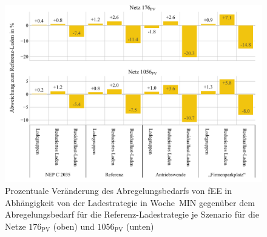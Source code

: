 \begin{figure}[H]
    \centering
    \includegraphics[width=\textwidth]{Bilder/176_1056_cur_fee_grid_week_A}
    \caption[Prozentuale Veränderung des Abregelungsbedarfs von fEE in Abhängigkeit von der Ladestrategie in Woche~MIN gegenüber dem Abregelungsbedarf für die Referenz-Ladestrategie je Szenario für die Netze \num{176} und \num{1056}]{Prozentuale Veränderung des Abregelungsbedarfs von fEE in Abhängigkeit von der Ladestrategie in Woche~MIN gegenüber dem Abregelungsbedarf für die Referenz-Ladestrategie je Szenario für die Netze \(176_{\text{PV}}\) (oben) und \(1056_{\text{PV}}\) (unten)}\label{fig:176_1056_cur_fee_grid_week_A}
\end{figure}